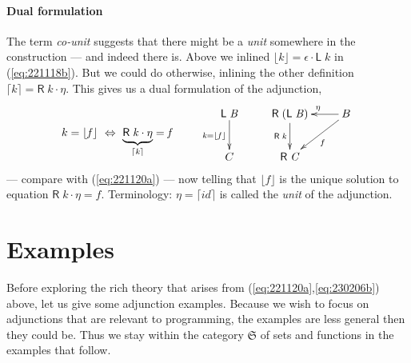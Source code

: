 \documentclass{elsarticle}
\newcommand{\Conid}[1]{\mathit{#1}}
\newcommand{\Varid}[1]{\mathit{#1}}
\def\myxym#1{\vcenter{\xymatrix{#1}}}
\def\comp{ \mathbin{\cdot} }
\def\fun#1{\mathsf{#1}}
\def\wider#1{~ #1 ~}
\def\cat#1{{\mathfrak #1}}
\def\equiv{\Leftrightarrow}
\begin{document}
\paragraph{Dual formulation}
The term \emph{co-unit} suggests that there might be a \emph{unit} somewhere in the construction
--- and indeed there is. Above we inlined \ensuremath{\lfloor \Varid{k}\rfloor\mathrel{=}\epsilon  \comp \fun L \;\Varid{k}} in (\ref{eq:221118b}).
But we could do otherwise, inlining the other definition \ensuremath{\lceil \Varid{k}\rceil\mathrel{=}\fun R \;\Varid{k} \comp \eta }. This gives
us a dual formulation of the adjunction,
\begin{eqnarray}
	k = \ensuremath{\lfloor \Varid{f}\rfloor} \wider\equiv \ensuremath{\underbrace{\fun R \;\Varid{k} \comp \eta }_{\lceil \Varid{k}\rceil}\mathrel{=}\Varid{f}}
& ~~~~ &
        \myxym{
	\ensuremath{\fun L \;\Conid{B}}
		\ar[d]_{\ensuremath{\Varid{k}\mathrel{=}\lfloor \Varid{f}\rfloor}}
&
	\ensuremath{\fun R \;(\fun L \;\Conid{B})}
		\ar[d]_{\ensuremath{\fun R \;\Varid{k}}}
&
	B
		\ar[l]_{\ensuremath{\eta }}
		\ar[ld]^{f}
\\
	C
&
	\ensuremath{\fun R \;\Conid{C}}
}
	\label{eq:230206b}
\end{eqnarray}
--- compare with (\ref{eq:221120a}) --- now telling that
\ensuremath{\lfloor \Varid{f}\rfloor} is the unique solution to equation \ensuremath{\fun R \;\Varid{k} \comp \eta \mathrel{=}\Varid{f}}.
Terminology: \ensuremath{\eta \mathrel{=}\lceil {id}\rceil} is called the \emph{unit} of the adjunction.

\section{Examples}
Before exploring the rich theory that arises from (\ref{eq:221120a},\ref{eq:230206b})
above, let us give some adjunction examples. Because we wish to focus on adjunctions
that are relevant to programming, the examples are less general then they
could be. Thus we stay within the category \ensuremath{\cat{S}} of sets and functions in the
examples that follow.
\end{document}
